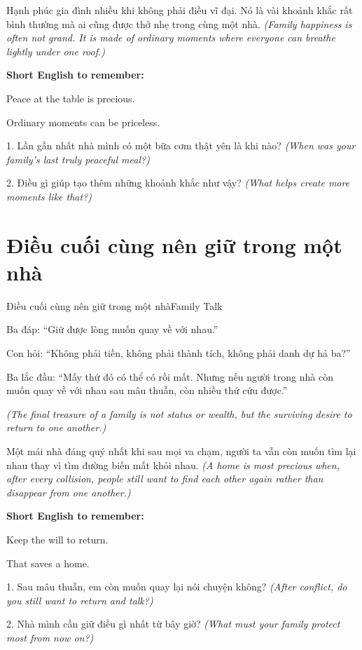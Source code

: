 \begin{baihoc}
Hạnh phúc gia đình nhiều khi không phải điều vĩ đại. Nó là vài khoảnh khắc rất bình thường mà ai cũng được thở nhẹ trong cùng một nhà.
\textit{(Family happiness is often not grand. It is made of ordinary moments where everyone can breathe lightly under one roof.)}
\end{baihoc}

\begin{ghinhoanh}
\textbf{Short English to remember:}

Peace at the table is precious.

Ordinary moments can be priceless.
\end{ghinhoanh}

\begin{tuhocnhanh}
1. Lần gần nhất nhà mình có một bữa cơm thật yên là khi nào? \textit{(When was your family's last truly peaceful meal?)}

2. Điều gì giúp tạo thêm những khoảnh khắc như vậy? \textit{(What helps create more moments like that?)}
\end{tuhocnhanh}
\ngancach

\section{Điều cuối cùng nên giữ trong một nhà}
\begin{truyen}{Điều cuối cùng nên giữ trong một nhà}{Family Talk}

Ba đáp: ``Giữ được lòng muốn quay về với nhau.''

Con hỏi: ``Không phải tiền, không phải thành tích, không phải danh dự hả ba?''

Ba lắc đầu: ``Mấy thứ đó có thể có rồi mất. Nhưng nếu người trong nhà còn muốn quay về với nhau sau mâu thuẫn, còn nhiều thứ cứu được.''

\textit{(The final treasure of a family is not status or wealth, but the surviving desire to return to one another.)}
\end{truyen}

\begin{baihoc}
Một mái nhà đáng quý nhất khi sau mọi va chạm, người ta vẫn còn muốn tìm lại nhau thay vì tìm đường biến mất khỏi nhau.
\textit{(A home is most precious when, after every collision, people still want to find each other again rather than disappear from one another.)}
\end{baihoc}

\begin{ghinhoanh}
\textbf{Short English to remember:}

Keep the will to return.

That saves a home.
\end{ghinhoanh}

\begin{tuhocnhanh}
1. Sau mâu thuẫn, em còn muốn quay lại nói chuyện không? \textit{(After conflict, do you still want to return and talk?)}

2. Nhà mình cần giữ điều gì nhất từ bây giờ? \textit{(What must your family protect most from now on?)}
\end{tuhocnhanh}
\ngancach